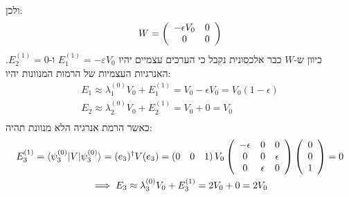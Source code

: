 \documentclass{tstextbook}
\begin{document}
\begin{example}
$$\begin{gather}
\end{gather}$$
ולכן:
$$W=\left(\begin{array}{c c}{{-\epsilon V_{0}}}&{{0}}\\ {{0}}&{{0}}\end{array}\right)$$
כיוון ש-\(W\) כבר אלכסונית נקבל כי הערכים עצמיים יהיו \(E_{1}^{(1)}=-\varepsilon V_{0}\) ו-\(E_{2}^{(1)}=0\). האנרגיות העצמיות של הרמות המנוונות יהיו:
$$\begin{gather}E_{1}\approx\lambda_{1}^{(0)}V_{0}+E_{1}^{(1)}=V_{0}-\epsilon V_{0}=V_{0}\left( 1-\epsilon \right)\\ E_{2}\approx\lambda_{2}^{(0)}V_{0}+E_{2}^{(1)}=V_{0}+0=V_{0}\\
\end{gather}$$
כאשר הרמת אנרגיה הלא מנוונת תהיה:
$$\begin{gather}E_{3}^{(1)}=\langle \psi_{3}^{(0)}|V|\psi_{3}^{(0)} \rangle=(e_{3})^{\dagger}V(e_{3})=\left(0\quad0\quad1\right)V_{0}\left(\begin{array}{c c c}{{-\epsilon}}&{{0}}&{{0}}\\ {{0}}&{{0}}&{{\epsilon}}\\ {{0}}&{{\epsilon}}&{{0}}\end{array}\right)\left(\begin{array}{c}{{0}}\\ {{0}}\\ {{1}}\end{array}\right)=0\\ \implies E_{3}\approx\lambda_{3}^{(0)}V_{0}+E_{3}^{(1)}=2V_{0}+0=2V_{0}
\end{gather}$$

\end{example}
\end{document}

